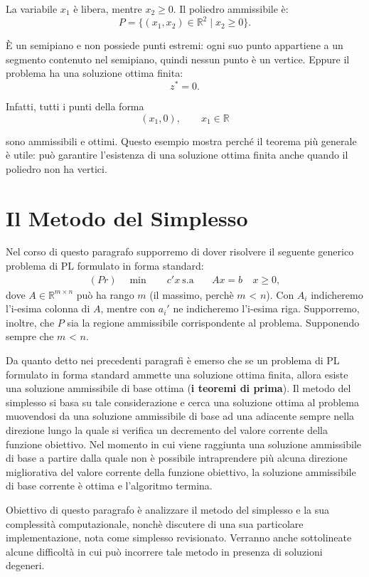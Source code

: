 La variabile \(x_1\) è libera, mentre \(x_2\geq 0\).
Il poliedro ammissibile è:
\[
P=\{(x_1,x_2)\in\mathbb R^2\mid x_2\geq 0\}.
\]

È un semipiano e non possiede punti estremi: ogni suo punto appartiene a un segmento contenuto nel semipiano, quindi nessun punto è un vertice.
Eppure il problema ha una soluzione ottima finita:
\[
z^*=0.
\]

Infatti, tutti i punti della forma
\[
(x_1,0),\qquad x_1\in\mathbb R
\]

sono ammissibili e ottimi.
Questo esempio mostra perché il teorema più generale è utile: può garantire l'esistenza di una soluzione ottima finita anche quando il poliedro non ha vertici.

\section{Il Metodo del Simplesso}

Nel corso di questo paragrafo supporremo di dover risolvere il seguente generico problema di PL formulato in forma standard:
\begin{equation}
\begin{aligned}
(Pr) \quad \min \quad & c'x \
\text{s.a} \quad & Ax = b \
& x \ge 0,
\end{aligned}
\end{equation}
dove $A \in \mathbb{R}^{m \times n}$ può ha rango $m$ (il massimo, perchè $m$ < $n$). Con $A_i$ indicheremo l'i-esima colonna di $A$, mentre con $a_i'$ ne indicheremo l'i-esima riga. Supporremo, inoltre, che $P$ sia la regione ammissibile corrispondente al problema.
Supponendo sempre che $m$ < $n$.

Da quanto detto nei precedenti paragrafi è emerso che se un problema di PL formulato in forma standard ammette una soluzione ottima finita, allora esiste una soluzione ammissibile di base ottima (\textbf{i teoremi di prima}). Il metodo del simplesso si basa su tale considerazione e cerca una soluzione ottima al problema muovendosi da una soluzione ammissibile di base ad una adiacente sempre nella direzione lungo la quale si verifica un decremento del valore corrente della funzione obiettivo. Nel momento in cui viene raggiunta una soluzione ammissibile di base a partire dalla quale non è possibile intraprendere più alcuna direzione migliorativa del valore corrente della funzione obiettivo, la soluzione ammissibile di base corrente è ottima e l'algoritmo termina.

Obiettivo di questo paragrafo è analizzare il metodo del simplesso e la sua complessità computazionale, nonchè discutere di una sua particolare implementazione, nota come simplesso revisionato. Verranno anche sottolineate alcune difficoltà in cui può incorrere tale metodo in presenza di soluzioni degeneri.


